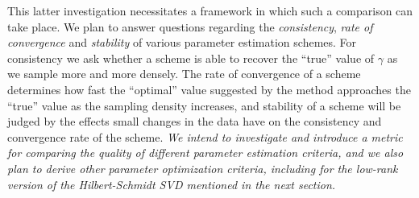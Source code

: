 \documentclass[11pt]{NSFamsart}
\begin{document}
This latter investigation necessitates a framework in which such a comparison can take place. We plan to answer questions regarding the \emph{consistency}, \emph{rate of convergence} and \emph{stability} of various parameter estimation schemes. For consistency we ask whether a scheme is able to recover the ``true'' value of $\gamma$ as we sample more and more densely. The rate of convergence of a scheme determines how fast the ``optimal'' value suggested by the method approaches the ``true'' value as the sampling density increases, and stability of a scheme will be judged by the effects small changes in the data have on the consistency and convergence rate of the scheme. \emph{We intend to investigate and introduce a metric for comparing the quality of different parameter estimation criteria, and we also plan to derive other parameter optimization criteria, including for the low-rank version of the Hilbert-Schmidt SVD mentioned in the next section.}
\end{document}
